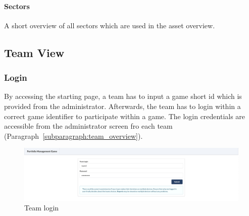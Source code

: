 \paragraph{Sectors}
A short overview of all sectors which are used in the asset overview.





\subsection{Team View}

\subsubsection{Login}
By accessing the starting page, a team has to input a game short id which is provided from the administrator. Afterwards, the team has to login within a correct game identifier to participate within a game. The login credentials are accessible from the administrator screen fro each team (Paragraph~\ref{subparagraph:team_overview}).
\begin{figure}[h!]
  \centering
  \includegraphics[scale=0.2]{img/application-overview/teams/01_login.png}
  \caption{Team login}
\end{figure}

